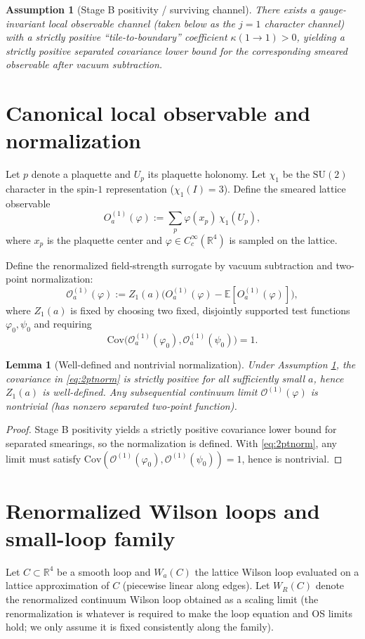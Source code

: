 \documentclass[11pt]{article}
\newtheorem{lemma}[theorem]{Lemma}
\newtheorem{assumption}[theorem]{Assumption}
\theoremstyle{definition}
\newcommand{\E}{\mathbb{E}}
\newcommand{\Cov}{\mathrm{Cov}}
\newcommand{\SU}{\mathrm{SU}}
\newcommand{\1}{\mathbf{1}}
\newcommand{\Reals}{\mathbb{R}}
\begin{document}
\begin{assumption}[Stage B positivity / surviving channel]\label{ass:stageB}
There exists a gauge-invariant local observable channel (taken below as the $j=1$ character channel)
with a strictly positive ``tile-to-boundary'' coefficient $\kappa(1\to 1)>0$, yielding a strictly
positive separated covariance lower bound for the corresponding smeared observable after vacuum subtraction.
\end{assumption}

\section{Canonical local observable and normalization}
Let $p$ denote a plaquette and $U_p$ its plaquette holonomy. Let $\chi_1$ be the $\SU(2)$ character
in the spin-$1$ representation ($\chi_1(I)=3$). Define the smeared lattice observable
\[
O^{(1)}_a(\varphi):=\sum_{p}\varphi(x_p)\,\chi_1(U_p),
\]
where $x_p$ is the plaquette center and $\varphi\in C_c^\infty(\Reals^4)$ is sampled on the lattice.

Define the renormalized field-strength surrogate by vacuum subtraction and two-point normalization:
\[
\mathcal O^{(1)}_a(\varphi):=Z_1(a)\Big(O^{(1)}_a(\varphi)-\E[O^{(1)}_a(\varphi)]\Big),
\]
where $Z_1(a)$ is fixed by choosing two fixed, disjointly supported test functions $\varphi_0,\psi_0$
and requiring
\begin{equation}\label{eq:2ptnorm}
\Cov\!\big(\mathcal O^{(1)}_a(\varphi_0),\mathcal O^{(1)}_a(\psi_0)\big)=1.
\end{equation}

\begin{lemma}[Well-defined and nontrivial normalization]\label{lem:Zwell}
Under Assumption \ref{ass:stageB}, the covariance in \eqref{eq:2ptnorm} is strictly positive for all
sufficiently small $a$, hence $Z_1(a)$ is well-defined. Any subsequential continuum limit
$\mathcal O^{(1)}(\varphi)$ is nontrivial (has nonzero separated two-point function).
\end{lemma}

\begin{proof}
Stage B positivity yields a strictly positive covariance lower bound for separated smearings, so the
normalization is defined. With \eqref{eq:2ptnorm}, any limit must satisfy
$\Cov(\mathcal O^{(1)}(\varphi_0),\mathcal O^{(1)}(\psi_0))=1$, hence is nontrivial.
\end{proof}

\section{Renormalized Wilson loops and small-loop family}
Let $C\subset\Reals^4$ be a smooth loop and $W_a(C)$ the lattice Wilson loop evaluated on a lattice
approximation of $C$ (piecewise linear along edges). Let $W_R(C)$ denote the renormalized continuum
Wilson loop obtained as a scaling limit (the renormalization is whatever is required to make the loop
equation and OS limits hold; we only assume it is fixed consistently along the family).
\end{document}
